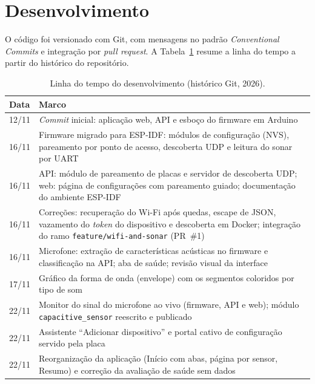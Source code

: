 \section{Desenvolvimento}
\label{sec:desenvolvimento}

O código foi versionado com Git, com mensagens no padrão \textit{Conventional Commits} e integração por \textit{pull request}. A Tabela~\ref{tab:linhadotempo} resume a linha do tempo a partir do histórico do repositório. 

\begin{table}[!ht]
\caption{Linha do tempo do desenvolvimento (histórico Git, 2026).}
\label{tab:linhadotempo}
\centering
\small
\begin{tabularx}{\linewidth}{l>{\hsize=1.000\hsize\raggedright\arraybackslash}X}
\toprule
\textbf{Data} & \textbf{Marco} \\
\midrule
12/11 & \textit{Commit} inicial: aplicação web, API e esboço do firmware em Arduino \\
16/11 & Firmware migrado para ESP-IDF: módulos de configuração (NVS), pareamento por ponto de acesso, descoberta UDP e leitura do sonar por UART \\
16/11 & API: módulo de pareamento de placas e servidor de descoberta UDP; web: página de configurações com pareamento guiado; documentação do ambiente ESP-IDF \\
16/11 & Correções: recuperação do Wi-Fi após quedas, escape de JSON, vazamento do \textit{token} do dispositivo e descoberta em Docker; integração do ramo \texttt{feature/wifi-and-sonar} (PR~\#1) \\
16/11 & Microfone: extração de características acústicas no firmware e classificação na API; aba de saúde; revisão visual da interface \\
17/11 & Gráfico da forma de onda (envelope) com os segmentos coloridos por tipo de som \\
22/11 & Monitor do sinal do microfone ao vivo (firmware, API e web); módulo \texttt{capacitive\_sensor} reescrito e publicado \\
22/11 & Assistente ``Adicionar dispositivo'' e portal cativo de configuração servido pela placa \\
22/11 & Reorganização da aplicação (Início com abas, página por sensor, Resumo) e correção da avaliação de saúde sem dados \\
\bottomrule
\end{tabularx}
\end{table}

